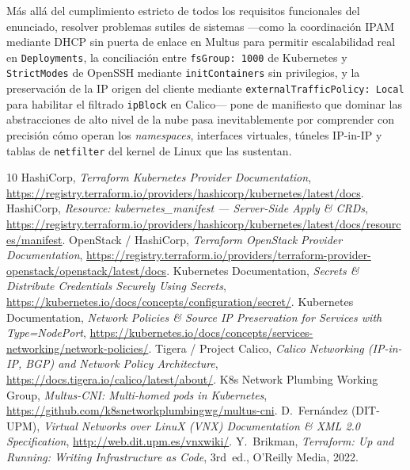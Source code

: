 Más allá del cumplimiento estricto de todos los requisitos funcionales del enunciado, resolver problemas sutiles de sistemas ---como la coordinación IPAM mediante DHCP sin puerta de enlace en Multus para permitir escalabilidad real en \texttt{Deployments}, la conciliación entre \texttt{fsGroup: 1000} de Kubernetes y \texttt{StrictModes} de OpenSSH mediante \texttt{initContainers} sin privilegios, y la preservación de la IP origen del cliente mediante \texttt{externalTrafficPolicy: Local} para habilitar el filtrado \texttt{ipBlock} en Calico--- pone de manifiesto que dominar las abstracciones de alto nivel de la nube pasa inevitablemente por comprender con precisión cómo operan los \textit{namespaces}, interfaces virtuales, túneles IP-in-IP y tablas de \texttt{netfilter} del kernel de Linux que las sustentan.

\begin{thebibliography}{10}
 HashiCorp, \textit{Terraform Kubernetes Provider Documentation}, \url{https://registry.terraform.io/providers/hashicorp/kubernetes/latest/docs}.
 HashiCorp, \textit{Resource: kubernetes\_manifest --- Server-Side Apply \& CRDs}, \url{https://registry.terraform.io/providers/hashicorp/kubernetes/latest/docs/resources/manifest}.
 OpenStack / HashiCorp, \textit{Terraform OpenStack Provider Documentation}, \url{https://registry.terraform.io/providers/terraform-provider-openstack/openstack/latest/docs}.
 Kubernetes Documentation, \textit{Secrets \& Distribute Credentials Securely Using Secrets}, \url{https://kubernetes.io/docs/concepts/configuration/secret/}.
 Kubernetes Documentation, \textit{Network Policies \& Source IP Preservation for Services with Type=NodePort}, \url{https://kubernetes.io/docs/concepts/services-networking/network-policies/}.
 Tigera / Project Calico, \textit{Calico Networking (IP-in-IP, BGP) and Network Policy Architecture}, \url{https://docs.tigera.io/calico/latest/about/}.
 K8s Network Plumbing Working Group, \textit{Multus-CNI: Multi-homed pods in Kubernetes}, \url{https://github.com/k8snetworkplumbingwg/multus-cni}.
 D.~Fernández (DIT-UPM), \textit{Virtual Networks over LinuX (VNX) Documentation \& XML 2.0 Specification}, \url{http://web.dit.upm.es/vnxwiki/}.
 Y.~Brikman, \textit{Terraform: Up and Running: Writing Infrastructure as Code}, 3rd~ed., O'Reilly Media, 2022.
\end{thebibliography}
